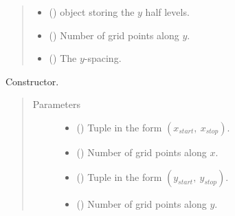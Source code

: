 \documentclass[letterpaper,10pt,english]{sphinxmanual}
\begin{document}
\begin{fulllineitems}
\begin{quote}
\begin{description}
\begin{itemize}
\item {} 
{\hyperref[\detokenize{api:grids.xyz_grid.XYZGrid.y_half_levels}]{}} () \textendash{} {\hyperref[\detokenize{api:grids.axis.Axis}]{}} object storing the \(y\) half levels.

\item {} 
{\hyperref[\detokenize{api:grids.xyz_grid.XYZGrid.ny}]{}} () \textendash{} Number of grid points along \(y\).

\item {} 
{\hyperref[\detokenize{api:grids.xyz_grid.XYZGrid.dy}]{}} () \textendash{} The \(y\)-spacing.

\end{itemize}

\end{description}\end{quote}

\begin{fulllineitems}
\label{\detokenize{api:grids.xy_grid.XYGrid.__init__}}
Constructor.
\begin{quote}\begin{description}
\item[{Parameters}] \leavevmode\begin{itemize}
\item {} 
 () \textendash{} Tuple in the form \((x_{start}, ~ x_{stop})\).

\item {} 
 () \textendash{} Number of grid points along \(x\).

\item {} 
 () \textendash{} Tuple in the form \((y_{start}, ~ y_{stop})\).

\item {} 
 () \textendash{} Number of grid points along \(y\).


\end{itemize}
\end{description}
\end{quote}
\end{fulllineitems}
\end{fulllineitems}
\end{document}
